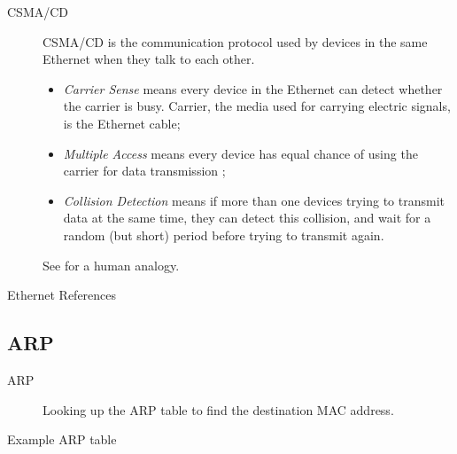 \begin{description}
\item[CSMA/CD] CSMA/CD is the communication protocol used by devices in the same Ethernet
  when they talk to each other.
  \begin{itemize}
  \item \emph{Carrier Sense} means every device in the Ethernet can detect whether the
    carrier is busy. Carrier, the media used for carrying electric signals, is the Ethernet cable;
  \item \emph{Multiple Access} means every device has equal chance of using the carrier
    for data transmission ;
  \item \emph{Collision Detection} means if more than one devices trying to transmit
    data at the same time, they can detect this collision, and wait for a random (but
    short) period before trying to transmit again.
  \end{itemize}
  See  for a human analogy.
\end{description}

\begin{frame}{Ethernet References}
  \begin{refsection}
  \nocite{wiki:ethernet,wiki:ethframe,wiki:csmacd,rfc1042} \printbibliography[heading=none]
\end{refsection}
\end{frame}

\subsection{ARP}

\begin{frame}
  \begin{description}
  \item[ARP] Looking up the ARP table to find the destination MAC address.
  \end{description}
  \begin{iblock}{Example ARP table}
  \end{iblock}
\end{frame}


